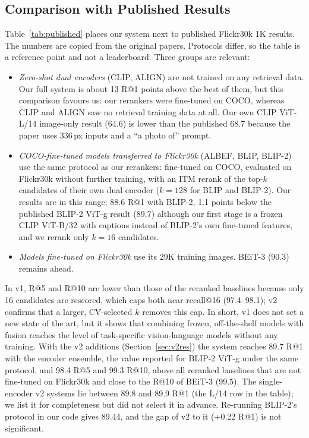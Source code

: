\documentclass[conference]{IEEEtran}
\begin{document}
\subsection{Comparison with Published Results}
Table~\ref{tab:published} places our system next to published Flickr30k 1K results. The numbers are copied
from the original papers. Protocols differ, so the table is a reference point and not a leaderboard. Three
groups are relevant:
\begin{itemize}
\item \emph{Zero-shot dual encoders} (CLIP, ALIGN) are not trained on any retrieval data. Our full system
is about 13 R@1 points above the best of them, but this comparison favours us: our rerankers were
fine-tuned on COCO, whereas CLIP and ALIGN saw no retrieval training data at all. Our own CLIP ViT-L/14
image-only result (64.6) is lower than the published 68.7 because the paper uses 336\,px inputs and a
``a photo of'' prompt.
\item \emph{COCO-fine-tuned models transferred to Flickr30k} (ALBEF, BLIP, BLIP-2) use the same protocol as
our rerankers: fine-tuned on COCO, evaluated on Flickr30k without further training, with an ITM rerank of
the top-$k$ candidates of their own dual encoder ($k=128$ for BLIP and BLIP-2). Our results are in this
range: 88.6 R@1 with BLIP-2, 1.1 points below the published BLIP-2 ViT-g result (89.7) although our
first stage is a frozen CLIP ViT-B/32 with captions instead of BLIP-2's own fine-tuned features, and we
rerank only $k=16$ candidates.
\item \emph{Models fine-tuned on Flickr30k} use its 29K training images. BEiT-3 (90.3) remains ahead.
\end{itemize}
In v1, R@5 and R@10 are lower than those of the reranked baselines because only 16 candidates are rescored,
which caps both near recall@16 (97.4--98.1); v2 confirms that a larger, CV-selected $k$ removes this cap. In short,
v1 does not set a new state of the art, but it shows that combining frozen, off-the-shelf models with
fusion reaches the level of task-specific vision-language models without any training.
With the v2 additions (Section~\ref{sec:v2res}) the system reaches 89.7 R@1 with the encoder ensemble, the value
reported for BLIP-2 ViT-g under the same protocol, and 98.4 R@5 and 99.3 R@10, above all reranked baselines that
are not fine-tuned on Flickr30k and close to the R@10 of BEiT-3 (99.5). The single-encoder v2 systems lie between
89.8 and 89.9 R@1 (the L/14 row in the table); we list it for completeness but did not select it in advance.
Re-running BLIP-2's protocol in our code gives 89.44, and the gap of v2 to it (+0.22 R@1) is not significant.
\end{document}

